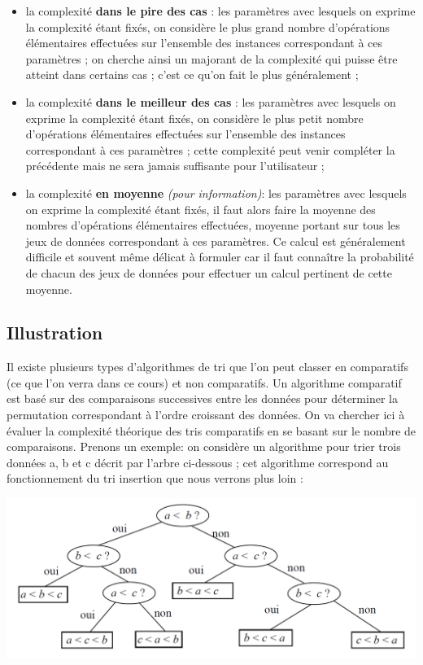 \documentclass[t,11pt]{article}
\begin{document}
\begin{itemize}
\item la complexité \textbf{dans le pire des cas} : les paramètres avec lesquels on exprime la
complexité étant fixés, on considère le plus grand nombre d’opérations
élémentaires effectuées sur l’ensemble des instances correspondant à ces
paramètres ; on cherche ainsi un majorant de la complexité qui puisse être atteint
dans certains cas ; c’est ce qu’on fait le plus généralement ;
\item la complexité \textbf{dans le meilleur des cas} : les paramètres avec lesquels on exprime la
complexité étant fixés, on considère le plus petit nombre d’opérations élémentaires
effectuées sur l’ensemble des instances correspondant à ces paramètres ; cette
complexité peut venir compléter la précédente mais ne sera jamais suffisante pour
l’utilisateur ;
\item la complexité \textbf{en moyenne} \textit{(pour information)}: les paramètres avec lesquels on exprime la complexité
étant fixés, il faut alors faire la moyenne des nombres d’opérations élémentaires effectuées, moyenne portant sur tous les jeux de données correspondant à ces paramètres. Ce calcul est généralement difficile et souvent même délicat à
formuler car il faut connaître la probabilité de chacun des jeux de données pour effectuer un calcul pertinent de cette moyenne.
\end{itemize}

\subsection{Illustration}
\noindent
Il existe plusieurs types d'algorithmes de tri que l'on peut classer en comparatifs (ce que l'on verra dans ce cours) et non comparatifs.
Un algorithme comparatif est basé sur des comparaisons successives entre les données pour déterminer la permutation correspondant à l'ordre croissant des données.
On va chercher ici à évaluer la complexité théorique des tris comparatifs en se basant sur le nombre de comparaisons.
\noindent
Prenons un exemple:
on considère un algorithme pour
trier trois données a, b et c décrit par l’arbre ci-dessous ; cet algorithme correspond au fonctionnement du tri insertion que nous verrons plus loin :
\begin{center}
\includegraphics[width=.85\textwidth]{images/C2.png}
\end{center}
\end{document}
